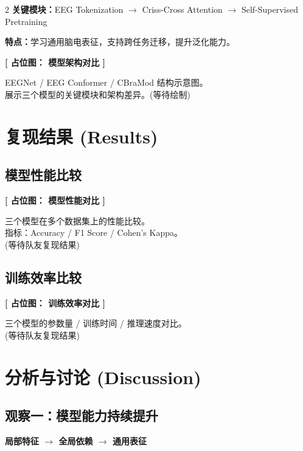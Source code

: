 \documentclass[12pt, a0paper]{article}
\renewcommand{\Large}{\fontsize{34}{42}\selectfont}
\renewcommand{\small}{\fontsize{18}{24}\selectfont}
\newcommand{\placeholder}[2]{%
    \begin{center}
    \colorbox{mygray!12}{\parbox{0.9\columnwidth}{%
        \centering
        \vspace{1.5em}
        {\Large\bfseries\color{mygray} [ 占位图： #1 ]}
        \vspace{0.8em}

        {\small\color{mygray} #2}
        \vspace{1.5em}
    }}
    \end{center}
}
\begin{document}
\begin{multicols}{2}
\textbf{关键模块：}EEG Tokenization $\rightarrow$ Criss-Cross Attention $\rightarrow$ Self-Supervised Pretraining

\textbf{特点：}学习通用脑电表征，支持跨任务迁移，提升泛化能力。

\placeholder{模型架构对比}{%
    EEGNet / EEG Conformer / CBraMod 结构示意图。\\
    展示三个模型的关键模块和架构差异。\quad (等待绘制)}

\section{复现结果 (Results)}

\subsection{模型性能比较}

\placeholder{模型性能对比}{%
    三个模型在多个数据集上的性能比较。\\
    指标：Accuracy / F1 Score / Cohen's Kappa。\\
    \small (等待队友复现结果)}

\subsection{训练效率比较}

\placeholder{训练效率对比}{%
    三个模型的参数量 / 训练时间 / 推理速度对比。\\
    \small (等待队友复现结果)}



\section{分析与讨论 (Discussion)}

\subsection{观察一：模型能力持续提升}

\begin{center}
\Large\bfseries
局部特征 \quad $\longrightarrow$ \quad 全局依赖 \quad $\longrightarrow$ \quad 通用表征
\end{center}


\end{multicols}
\end{document}
